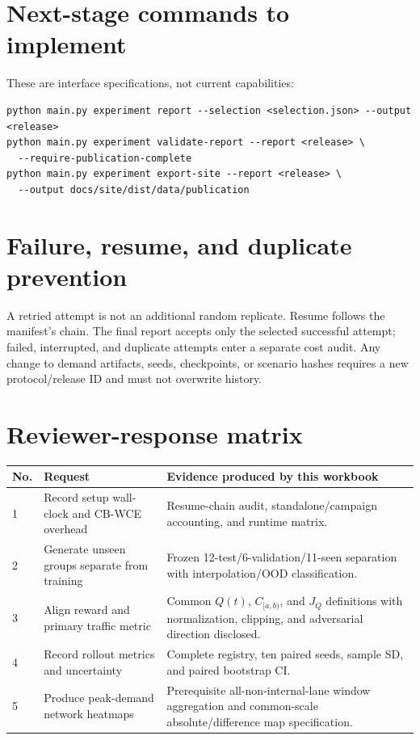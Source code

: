 \section{Next-stage commands to implement}
These are interface specifications, not current capabilities:
\begin{Verbatim}[fontsize=\small,breaklines=true]
python main.py experiment report --selection <selection.json> --output <release>
python main.py experiment validate-report --report <release> \
  --require-publication-complete
python main.py experiment export-site --report <release> \
  --output docs/site/dist/data/publication
\end{Verbatim}

\section{Failure, resume, and duplicate prevention}
A retried attempt is not an additional random replicate. Resume follows the manifest's  chain. The final report accepts only the selected successful attempt; failed, interrupted, and duplicate attempts enter a separate cost audit. Any change to demand artifacts, seeds, checkpoints, or scenario hashes requires a new protocol/release ID and must not overwrite history.

\section{Reviewer-response matrix}
\begin{longtable}{@{}p{}p{}p{}@{}}
\toprule
No. & Request & Evidence produced by this workbook \\
\midrule
1 & Record setup wall-clock and CB-WCE overhead & Resume-chain audit, standalone/campaign accounting, and runtime matrix.\\
2 & Generate unseen groups separate from training & Frozen 12-test/6-validation/11-seen separation with interpolation/OOD classification.\\
3 & Align reward and primary traffic metric & Common $Q(t)$, $C_{[a,b)}$, and $J_Q$ definitions with normalization, clipping, and adversarial direction disclosed.\\
4 & Record rollout metrics and uncertainty & Complete registry, ten paired seeds, sample SD, and paired bootstrap CI.\\
5 & Produce peak-demand network heatmaps & Prerequisite all-non-internal-lane window aggregation and common-scale absolute/difference map specification.\\
\bottomrule
\end{longtable}

